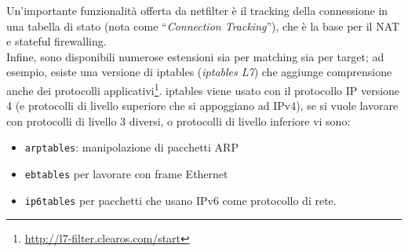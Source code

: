 Un'importante funzionalità offerta da netfilter è il tracking della connessione
in una tabella di stato (nota come ``\textit{Connection Tracking}''), che è la base
per il NAT e stateful firewalling.\\
Infine, sono disponibili numerose estensioni sia per matching sia per target;
ad esempio, esiste una versione di iptables
(\textit{iptables L7}) che aggiunge comprensione anche dei protocolli
applicativi\footnote{\url{http://l7-filter.clearos.com/start}}.
iptables viene usato con il protocollo IP versione 4 (e protocolli di livello
superiore che si appoggiano ad IPv4), se si vuole lavorare con protocolli
di livello 3 diversi, o protocolli di livello inferiore vi sono:
\begin{itemize}
  \item \texttt{arptables}: manipolazione di pacchetti ARP
  \item \texttt{ebtables} per lavorare con frame Ethernet
  \item \texttt{ip6tables} per pacchetti che usano IPv6 come protocollo di rete.
\end{itemize}

